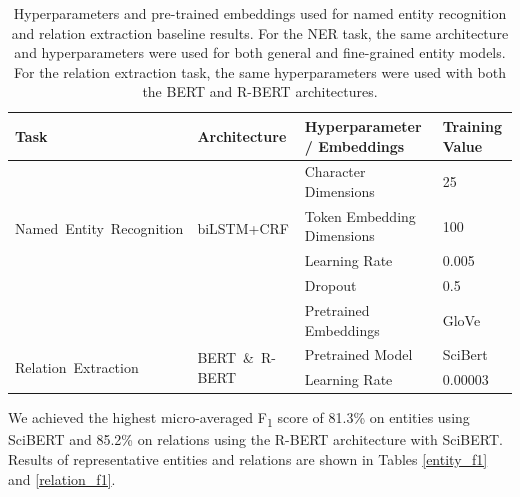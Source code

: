 \documentclass[fleqn,10pt]{wlscirep}
\begin{document}
\def\arraystretch{1.2}
\begin{table}[h!]
\begin{tabular}{m{4cm} m{3cm} m{5cm} m{3cm}}
 \toprule
 \textbf{Task} & \textbf{Architecture} & \textbf{Hyperparameter / Embeddings} & \textbf{Training Value} \\
 \hline
    \multirow{4}{}{\mbox{Named Entity Recognition}} &
    \multirow{4}{}{\mbox{biLSTM+CRF}} 
        & Character Dimensions & 25 \\
        & & Token Embedding Dimensions & 100 \\
        & & Learning Rate & 0.005 \\
        & & Dropout & 0.5 \\
        & & Pretrained Embeddings & GloVe \cite{pennington2014glove} \\
    \hline
    \multirow{2}{}{\mbox{Relation Extraction}} &
    \multirow{2}{}{\mbox{BERT \& R-BERT}} 
        & Pretrained Model & SciBert  \\
        & & Learning Rate & 0.00003 \\
 \hline
\end{tabular}
\caption{Hyperparameters and pre-trained embeddings used for named entity recognition and relation extraction baseline results. For the NER task, the same architecture and hyperparameters were used for both general and fine-grained entity models. For the relation extraction task, the same hyperparameters were used with both the BERT and R-BERT architectures.}
\label{tbl_hyperparams}
\end{table}

\noindent  We achieved the highest micro-averaged F\textsubscript{1} score of 81.3\% on entities using SciBERT and 85.2\% on relations using the R-BERT architecture with SciBERT. Results of representative entities and relations are shown in Tables \ref{entity_f1} and \ref{relation_f1}. \\
\end{document}
